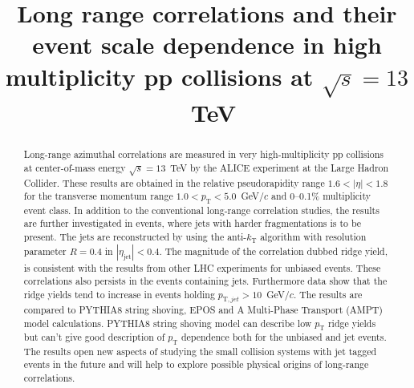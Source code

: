 \documentclass[ALICE,manyauthors]{cernphprep}
\begin{document}
\begin{titlepage}

\PHyear{}
\PHdate{\today}
%

\title{Long range correlations and their event scale dependence in high multiplicity pp collisions at $\sqrt{s} = 13$~TeV}


\begin{abstract}
%

Long-range azimuthal correlations are measured in very high-multiplicity pp collisions at center-of-mass energy $\sqrt{s} = 13$~TeV by the ALICE experiment at the Large Hadron Collider. 
These results are obtained in the relative pseudorapidity range $1.6 < |\eta| < 1.8$ for the transverse momentum range $1.0 < p_{\mathrm T} < 5.0$~GeV/$c$ and 0--0.1\% multiplicity event class.
In addition to the conventional long-range correlation studies, the results are further investigated in events, where jets with harder fragmentations is to be present.
The jets are reconstructed by using the anti-$k_\mathrm{T}$ algorithm with resolution parameter $R=0.4$ in $|\eta_\mathrm{jet}|<0.4$. 
The magnitude of the correlation dubbed ridge yield, is consistent with the results from other LHC experiments for unbiased events. 
These correlations also persists in the events containing jets. Furthermore data show that the ridge yields tend to increase in events holding $p_{\mathrm T, jet} > 10$~GeV/$c$.
The results are compared to PYTHIA8 string shoving, EPOS and A Multi-Phase Transport ({AMPT}) model calculations.  
PYTHIA8 string shoving model can describe low $p_{\mathrm T}$  ridge yields but can't give good description of  $p_{\mathrm T}$ dependence both for the unbiased and jet events.
The results open new aspects of studying the small collision systems with jet tagged events in the future and will help to explore possible physical origins of long-range correlations.

\end{abstract}

\end{titlepage}
\end{document}
